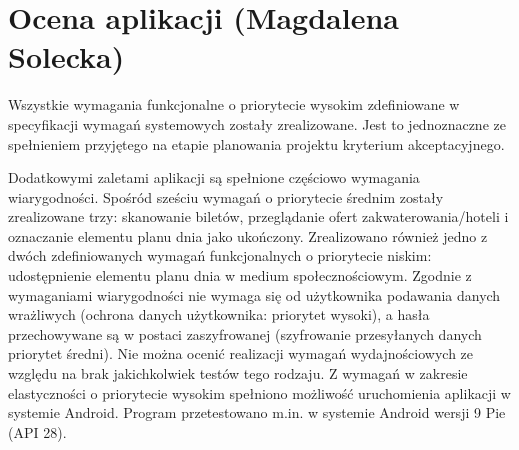 \section{Ocena aplikacji (Magdalena Solecka)}
\par Wszystkie wymagania funkcjonalne o priorytecie wysokim zdefiniowane w specyfikacji 
wymagań systemowych zostały zrealizowane. Jest to jednoznaczne ze spełnieniem przyjętego 
na etapie planowania projektu kryterium akceptacyjnego. 

\par Dodatkowymi zaletami aplikacji są spełnione częściowo wymagania wiarygodności. Spośród sześciu wymagań o priorytecie średnim zostały zrealizowane trzy: skanowanie biletów, przeglądanie ofert zakwaterowania/hoteli i oznaczanie elementu planu dnia jako ukończony. Zrealizowano również jedno z dwóch zdefiniowanych wymagań funkcjonalnych o priorytecie niskim: udostępnienie elementu planu dnia w medium społecznościowym. Zgodnie z wymaganiami 
wiarygodności nie wymaga się od użytkownika podawania danych wrażliwych (ochrona danych 
użytkownika: priorytet wysoki), a hasła przechowywane są w postaci zaszyfrowanej 
(szyfrowanie przesyłanych danych priorytet średni). Nie można ocenić realizacji wymagań 
wydajnościowych ze względu na brak jakichkolwiek testów tego rodzaju. Z wymagań w 
zakresie elastyczności o priorytecie wysokim spełniono możliwość uruchomienia aplikacji 
w systemie Android. Program przetestowano m.in. w systemie Android wersji 9 Pie (API 
28).